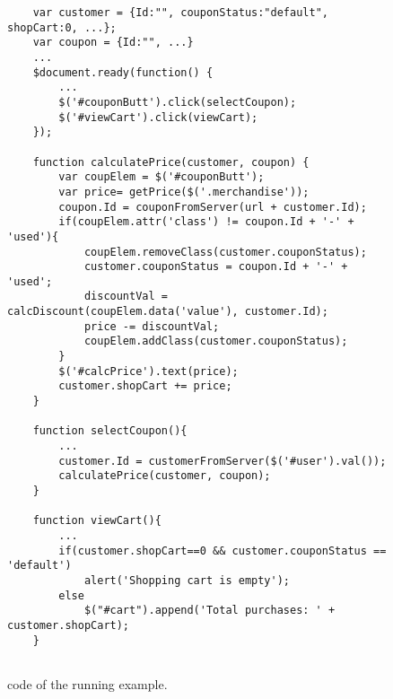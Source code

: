 \begin{figure}
\begin{lstlisting}
	var customer = {Id:"", couponStatus:"default", shopCart:0, ...};
	var coupon = {Id:"", ...}
	...
	$document.ready(function() {
		...
		$('#couponButt').click(selectCoupon);
		$('#viewCart').click(viewCart);
	});
	
	function calculatePrice(customer, coupon) {
		var coupElem = $('#couponButt');
		var price= getPrice($('.merchandise'));
		coupon.Id = couponFromServer(url + customer.Id);
		if(coupElem.attr('class') != coupon.Id + '-' + 'used'){
			coupElem.removeClass(customer.couponStatus);
			customer.couponStatus = coupon.Id + '-' + 'used';
			discountVal = calcDiscount(coupElem.data('value'), customer.Id);
			price -= discountVal;	
			coupElem.addClass(customer.couponStatus);
		} 	
		$('#calcPrice').text(price);
		customer.shopCart += price;
	}
	
	function selectCoupon(){
		...
		customer.Id = customerFromServer($('#user').val());
		calculatePrice(customer, coupon);
	}

	function viewCart(){
		...
		if(customer.shopCart==0 && customer.couponStatus == 'default')
			alert('Shopping cart is empty');
		else
			$("#cart").append('Total purchases: ' + customer.shopCart);
	}


\end{lstlisting}
\vspace{-0.1in} 

\caption{\javascript code of the running example.}
\label{Fig:example}
\vspace{-0.2in} 

\end{figure}
